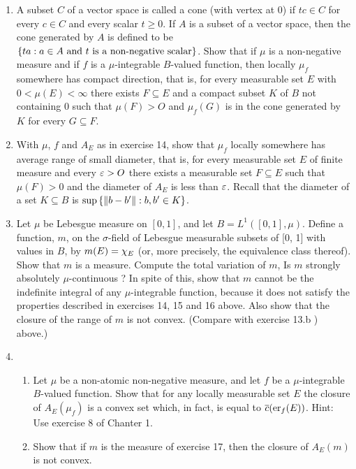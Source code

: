 \begin{enumerate}[label=\arabic*)]
\item A subset $C$ of a vector space is called a cone (with vertex at 0) if $tc\in C$ for every $c\in C$ and every scalar $t\geq0$. If $A$ is a subset of a vector space, then the cone generated by $A$ is defined to be $\brc{ta:a\in A\text{ and }t\text{ is a non-negative scalar}}$. Show that if $\mu$ is a non-negative measure and if $f$ is a $\mu$-integrable $B$-valued function, then locally $\mu_f$ somewhere has compact direction, that is, for every measurable set $E$ with $0<\mu(E)<\infty$ there exists $F\subseteq E$ and a compact subset $K$ of $B$ not containing $0$ such that $\mu(F)>O$ and $\mu_f(G)$ is in the cone generated by $K$ for every $G\subseteq F$.

\item With $\mu$, $f$ and $A_E$ as in exercise 14, show that $\mu_f$ locally somewhere has average range of small diameter, that is, for every measurable set $E$ of finite measure and every $\ep>O$ there exists a measurable set $F\subseteq E$ such that $\mu(F)>0$ and the diameter of $A_E$ is less than $\ep$. Recall that the diameter of a set $K\subseteq B$ is $\sup\brc{\norm{b-b'}:b,b'\in K}$.

\item Let $\mu$ be Lebesgue measure on $[0,1]$, and let $B=L^1([0,1],\mu)$. Define a function, $m$, on the $\sigma$-field of Lebesgue measurable subsets of [0, 1] with values in $B$, by $m(E)=\idf{E}$ (or, more precisely, the equivalence class thereof). Show that $m$ is a measure. Compute the total variation of $m$, Is $m$ strongly absolutely $\mu$-continuous ? In spite of this, show that $m$ cannot be the indefinite integral of any $\mu$-integrable function, because it does not satisfy the properties described in exercises 14, 15 and 16 above. Also show that the closure of the range of $m$ is not convex. (Compare with exercise 13.b ) above.)

\item
\begin{enumerate}[label=\alph*)]
    \item Let $\mu$ be a non-atomic non-negative measure, and let $f$ be a $\mu$-integrable $B$-valued function. Show that for any locally measurable set $E$ the closure of $A_E(\mu_f)$ is a convex set which, in fact, is equal to $\overline{c}(\er{E}{f})$. Hint: Use exercise 8 of Chanter 1.
    
    \item Show that if $m$ is the measure of exercise 17, then the closure of $A_E(m)$ is not convex.


\end{enumerate}
\end{enumerate}
